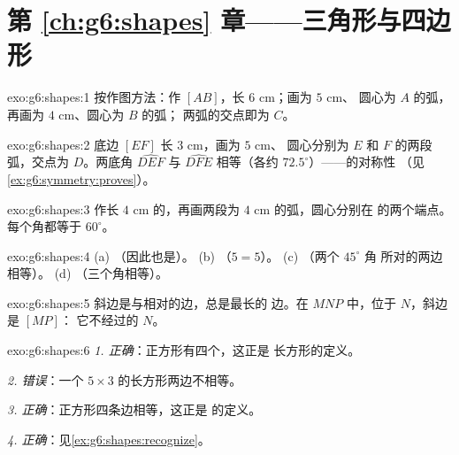 \section*{第 \ref{ch:g6:shapes} 章——三角形与四边形}

\begin{solution}{exo:g6:shapes:1}
按作图方法：作 $[AB]$，长 $6$ cm；画为 $5$ cm、
圆心为 $A$ 的弧，再画为 $4$ cm、圆心为 $B$ 的弧；
两弧的交点即为 $C$。
\end{solution}

\begin{solution}{exo:g6:shapes:2}
底边 $[EF]$ 长 $3$ cm，画为 $5$ cm、
圆心分别为 $E$ 和 $F$ 的两段弧，交点为 $D$。两底角 $\widehat{DEF}$
与 $\widehat{DFE}$ 相等（各约 $72.5^\circ$）——的对称性
（见\cref{ex:g6:symmetry:proves}）。
\end{solution}

\begin{solution}{exo:g6:shapes:3}
作长 $4$ cm 的，再画两段为 $4$ cm 的弧，圆心分别在
的两个端点。每个角都等于 $60^\circ$。
\end{solution}

\begin{solution}{exo:g6:shapes:4}
(a) （因此也是）。\quad
(b) （$5 = 5$）。\quad
(c) （两个 $45^\circ$ 角
所对的两边相等）。\quad
(d) （三个角相等）。
\end{solution}

\begin{solution}{exo:g6:shapes:5}
斜边是与相对的边，总是最长的
边。在 $MNP$ 中，位于 $N$，斜边是 $[MP]$：
它不经过的 $N$。
\end{solution}

\begin{solution}{exo:g6:shapes:6}
\emph{1. 正确}：正方形有四个，这正是
长方形的定义。

\emph{2. 错误}：一个 $5 \times 3$ 的长方形两边不相等。

\emph{3. 正确}：正方形四条边相等，这正是
的定义。

\emph{4. 正确}：见\cref{ex:g6:shapes:recognize}。
\end{solution}

